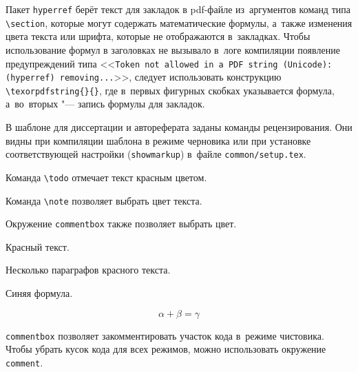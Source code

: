 Пакет \texttt{hyperref} берёт текст для закладок в pdf-файле из~аргументов
команд типа \verb|\section|, которые могут содержать математические формулы,
а~также изменения цвета текста или шрифта, которые не отображаются в~закладках.
Чтобы использование формул в заголовках не вызывало в~логе компиляции появление
предупреждений типа <<\texttt{Token not allowed in~a~PDF string
    (Unicode):(hyperref) removing...}>>, следует использовать конструкцию
\verb|\texorpdfstring{}{}|, где в~первых фигурных скобках указывается
формула, а~во~вторых "--- запись формулы для закладок.


В шаблоне для диссертации и автореферата заданы команды рецензирования.
Они видны при компиляции шаблона в режиме черновика или при установке
соответствующей настройки (\verb+showmarkup+) в~файле \verb+common/setup.tex+.

Команда \verb+\todo+ отмечает текст красным цветом.

Команда \verb+\note+ позволяет выбрать цвет текста.
  
 

Окружение \verb+commentbox+ также позволяет выбрать цвет.

\begin{commentbox}[red]
    Красный текст.

    Несколько параграфов красного текста.
\end{commentbox}

\begin{commentbox}[blue]
    Синяя формула.

    \begin{equation}
        \alpha + \beta = \gamma
    \end{equation}
\end{commentbox}

\verb+commentbox+ позволяет закомментировать участок кода в~режиме чистовика.
Чтобы убрать кусок кода для всех режимов, можно использовать окружение
\verb+comment+.

